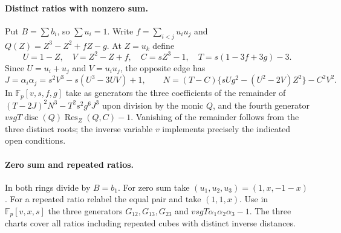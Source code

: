 \documentclass[11pt,letterpaper]{article}
\theoremstyle{definition}
\begin{document}
\paragraph{Distinct ratios with nonzero sum.}
Put $B=\sum b_i$, so $\sum u_i=1$. Write $f=\sum_{i<j}u_i u_j$
and $Q(Z)=Z^3-Z^2+fZ-g$. At $Z=u_k$ define
\[
 U=1-Z,\quad V=Z^2-Z+f,\quad C=sZ^3-1,\quad
 T=s(1-3f+3g)-3 .
\]
Since $U=u_i+u_j$ and $V=u_i u_j$, the opposite edge has
\[
 J=\alpha_i\alpha_j=s^2V^3-s(U^3-3UV)+1,\qquad
 N=(T-C)\{sUg^2-(U^2-2V)Z^2\}-C^2V^2 .
\]
In $\mathbb F_p[v,s,f,g]$ take as generators the three coefficients
of the remainder of $(T-2J)^2N^3-T^2s^2g^6J^3$ upon division by
the monic $Q$, and the fourth generator
$vsgT\operatorname{disc}(Q)\operatorname{Res}_Z(Q,C)-1$.
Vanishing of the remainder follows from the three distinct roots;
the inverse variable $v$ implements precisely the indicated open
conditions.

\paragraph{Zero sum and repeated ratios.}
In both rings divide by $B=b_1$. For zero sum take
$(u_1,u_2,u_3)=(1,x,-1-x)$. For a repeated ratio relabel the
equal pair and take $(1,1,x)$. Use in $\mathbb F_p[v,x,s]$ the
three generators $G_{12},G_{13},G_{23}$ and
$vsgT\alpha_1\alpha_2\alpha_3-1$. The three charts cover all
ratios including repeated cubes with distinct inverse distances.
\end{document}

